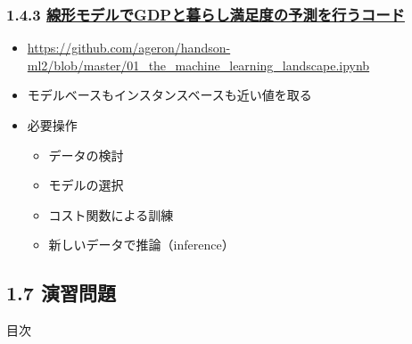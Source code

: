 \documentclass[aspectratio=169, dvipdfmx, 14pt, xcolor={svgnames,dvipsnames}]{beamer}
\def\tightlist{\itemsep1pt\parskip0pt\parsep0pt}
\begin{document}
\begin{frame}
  \frametitle{1.4.3 \href{https://github.com/ageron/handson-ml2/blob/master/01_the_machine_learning_landscape.ipynb}{線形モデルでGDPと暮らし満足度の予測を行うコード}}

  \begin{itemize}
    \tightlist
    \item
          \url{https://github.com/ageron/handson-ml2/blob/master/01\_the\_machine\_learning\_landscape.ipynb}
    \item
          モデルベースもインスタンスベースも近い値を取る
    \item
          必要操作

          \begin{itemize}
            \tightlist
            \item
                  データの検討
            \item
                  モデルの選択
            \item
                  コスト関数による訓練
            \item
                  新しいデータで推論（inference）
          \end{itemize}
  \end{itemize}
\end{frame}


\subsection{1.7 演習問題}\label{ux6f14ux7fd2ux554fux984c}
\begin{frame}{目次}
  \tableofcontents[currentsubsection]
\end{frame}

\end{document}
